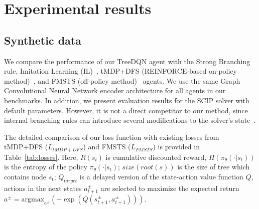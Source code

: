 \documentclass[preprint,12pt]{elsarticle} %
\theoremstyle{plain}
\theoremstyle{definition}
\theoremstyle{remark}
\newcommand{\argmax}{\mathrm{argmax}}
\begin{document}
\section{Experimental results}\label{sec:experiments}

\subsection{Synthetic data}
We compare the performance of our TreeDQN agent with the Strong Branching rule, Imitation Learning (IL)~\cite{gasse_2019}, tMDP+DFS (REINFORCE-based on-policy method)~\cite{scavuzzo_2022}, and FMSTS (off-policy method)~\cite{etheve_2020} agents. We use the same Graph Convolutional Neural Network encoder architecture for all agents in our benchmarks. 
In addition, we present evaluation results for the SCIP solver with default parameters. However, it is not a direct competitor to our method, since internal branching rules can introduce several modifications to the solver's state~\cite{measuring_branching_rules}.

The detailed comparison of our loss function with existing losses from tMDP+DFS ($L_{tMDP+DFS}$) and FMSTS ($L_{FMSTS}$) is provided in Table~\ref{tab:losses}. Here, $R(s_t)$ is cumulative discounted reward, $H(\pi_{\theta}(\cdot |s_t))$ is the entropy of the policy $\pi_{\theta}(\cdot |s_t)$; $size(root(s))$ is the size of tree which contains node $s_t$; $Q_{target}$ is a delayed version of the state-action value function $Q$, actions in the next states $a^{\pm}_{t+1}$ are selected to maximize the expected return $a^{\pm} = \argmax_{a^{\pm}}  \left(-\exp \left(Q(s^{\pm}_{t+1},a^{\pm}_{t+1})\right)\right)$.


\begin{table}[t]
\caption{Loss functions used by RL algorithms to learn the variable selection task.}\label{tab:losses}
\begin{center}
\end{center}
\end{table}
\end{document}
